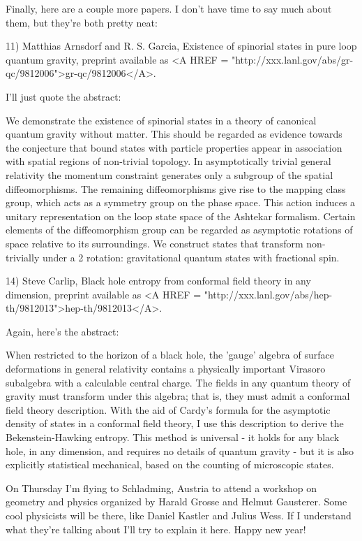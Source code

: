Finally, here are a couple more papers.  I don't have time to say much 
about them, but they're both pretty neat:

11) Matthias Arnsdorf and R. S. Garcia, Existence of spinorial states in
pure loop quantum gravity, preprint available as <A HREF = "http://xxx.lanl.gov/abs/gr-qc/9812006">gr-qc/9812006</A>.

I'll just quote the abstract:

     We demonstrate the existence of spinorial states in a theory of
     canonical quantum gravity without matter. This should be regarded
     as evidence towards the conjecture that bound states with particle
     properties appear in association with spatial regions of
     non-trivial topology. In asymptotically trivial general relativity
     the momentum constraint generates only a subgroup of the spatial
     diffeomorphisms. The remaining diffeomorphisms give rise to the
     mapping class group, which acts as a symmetry group on the phase
     space. This action induces a unitary representation on the loop
     state space of the Ashtekar formalism. Certain elements of the
     diffeomorphism group can be regarded as asymptotic rotations of
     space relative to its surroundings. We construct states that
     transform non-trivially under a 2 \pi  rotation: gravitational
     quantum states with fractional spin.

14) Steve Carlip, Black hole entropy from conformal field theory in any 
dimension, preprint available as 
<A HREF = "http://xxx.lanl.gov/abs/hep-th/9812013">hep-th/9812013</A>.

Again, here's the abstract:

     When restricted to the horizon of a black hole, the 'gauge'
     algebra of surface deformations in general relativity contains a
     physically important Virasoro subalgebra with a calculable central
     charge. The fields in any quantum theory of gravity must transform
     under this algebra; that is, they must admit a conformal field
     theory description. With the aid of Cardy's formula for the
     asymptotic density of states in a conformal field theory, I use
     this description to derive the Bekenstein-Hawking entropy. This method
     is universal - it holds for any black hole, in any dimension, and
     requires no details of quantum gravity - but it is also explicitly
     statistical mechanical, based on the counting of microscopic
     states.

On Thursday I'm flying to Schladming, Austria to attend a workshop on 
geometry and physics organized by Harald Grosse and Helmut Gausterer.
Some cool physicists will be there, like Daniel Kastler and Julius Wess.  
If I understand what they're talking about I'll try to explain it here.  
Happy new year!

